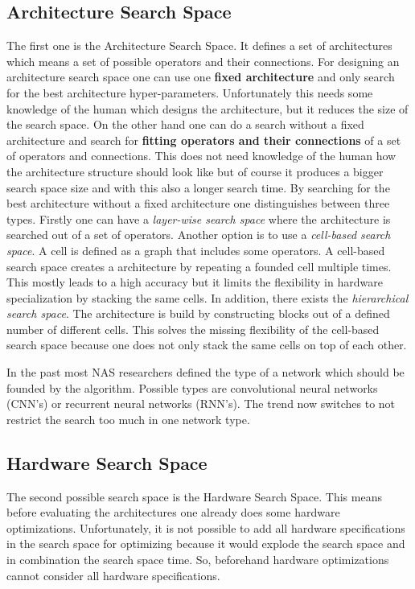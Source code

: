 \documentclass[conference]{IEEEtran}
\begin{document}
\subsection{Architecture Search Space}
The first one is the Architecture Search Space. It defines a set of architectures which means a set of possible operators and their connections. For designing an architecture search space one can use one \textbf{fixed architecture} and only search for the best architecture hyper-parameters. Unfortunately this needs some knowledge of the human which designs the architecture, but it reduces the size of the search space. On the other hand one can do a search without a fixed architecture and search for \textbf{fitting operators and their connections} of a set of operators and connections. This does not need knowledge of the human how the architecture structure should look like but of course it produces a bigger search space size and with this also a longer search time. By searching for the best architecture without a fixed architecture one distinguishes between three types. Firstly one can have a \textit{layer-wise search space} where the architecture is searched out of a set of operators. Another option is to use a \textit{cell-based search space}. A cell is defined as a graph that includes some operators. A cell-based search space creates a architecture by repeating a founded cell multiple times. This mostly leads to a high accuracy but it limits the flexibility in hardware specialization by stacking the same cells. In addition, there exists the \textit{hierarchical search space}. The architecture is build by constructing blocks out of a defined number of different cells. This solves the missing flexibility of the cell-based search space because one does not only stack the same cells on top of each other. 

In the past most NAS researchers defined the type of a network which should be founded by the algorithm. Possible types are convolutional neural networks (CNN's) or recurrent neural networks (RNN's). The trend now switches to not restrict the search too much in one network type. 

\subsection{Hardware Search Space}
The second possible search space is the Hardware Search Space. This means before evaluating the architectures one already does some hardware optimizations. Unfortunately, it is not possible to add all hardware specifications in the search space for optimizing because it would explode the search space and in combination the search space time. So, beforehand hardware optimizations cannot consider all hardware specifications.
\end{document}
